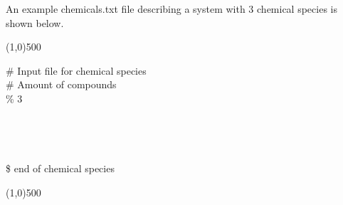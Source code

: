 \documentclass[twoside,11pt,fleqn,a4paper,english,openright]{report}
\begin{document}
An example chemicals.txt file describing a system with 3 chemical species is shown below.
\vspace{15mm}
$\,$\\
\centerline{\line(1,0){500}}
\vspace{15mm}
\addtolength{\leftskip}{-\parindent}
\# Input file for chemical species\\
\# Amount of compounds\\
\% 3\\
\\
\\
\\
\\
\$ end of chemical species\\
\addtolength{\leftskip}{\parindent}
\vspace{15mm}
$\,$\\
\centerline{\line(1,0){500}}
\end{document}
